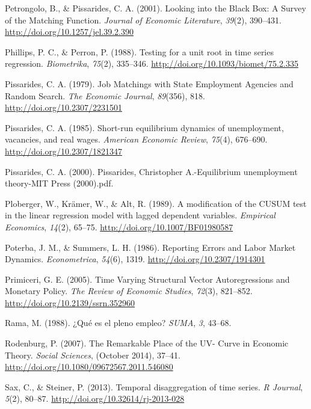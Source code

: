 \documentclass[12pt,oneside]{reedthesis}
\begin{document}
\leavevmode\hypertarget{ref-Petrongolo2001}{}%
Petrongolo, B., \& Pissarides, C. A. (2001). Looking into the Black Box: A Survey of the Matching Function. \emph{Journal of Economic Literature}, \emph{39}(2), 390--431. \url{http://doi.org/10.1257/jel.39.2.390}

\leavevmode\hypertarget{ref-PhillipsPerron1988}{}%
Phillips, P. C., \& Perron, P. (1988). Testing for a unit root in time series regression. \emph{Biometrika}, \emph{75}(2), 335--346. \url{http://doi.org/10.1093/biomet/75.2.335}

\leavevmode\hypertarget{ref-Pissarides1979}{}%
Pissarides, C. A. (1979). Job Matchings with State Employment Agencies and Random Search. \emph{The Economic Journal}, \emph{89}(356), 818. \url{http://doi.org/10.2307/2231501}

\leavevmode\hypertarget{ref-Pissarides1985}{}%
Pissarides, C. A. (1985). Short-run equilibrium dynamics of unemployment, vacancies, and real wages. \emph{American Economic Review}, \emph{75}(4), 676--690. \url{http://doi.org/10.2307/1821347}

\leavevmode\hypertarget{ref-Pissarides2000}{}%
Pissarides, C. A. (2000). Pissarides, Christopher A.-Equilibrium unemployment theory-MIT Press (2000).pdf.

\leavevmode\hypertarget{ref-Ploberger1989}{}%
Ploberger, W., Krämer, W., \& Alt, R. (1989). A modification of the CUSUM test in the linear regression model with lagged dependent variables. \emph{Empirical Economics}, \emph{14}(2), 65--75. \url{http://doi.org/10.1007/BF01980587}

\leavevmode\hypertarget{ref-Poterba1986}{}%
Poterba, J. M., \& Summers, L. H. (1986). Reporting Errors and Labor Market Dynamics. \emph{Econometrica}, \emph{54}(6), 1319. \url{http://doi.org/10.2307/1914301}

\leavevmode\hypertarget{ref-Primiceri2005}{}%
Primiceri, G. E. (2005). Time Varying Structural Vector Autoregressions and Monetary Policy. \emph{The Review of Economic Studies}, \emph{72}(3), 821--852. \url{http://doi.org/10.2139/ssrn.352960}

\leavevmode\hypertarget{ref-Rama1988}{}%
Rama, M. (1988). ¿Qué es el pleno empleo? \emph{SUMA}, \emph{3}, 43--68.

\leavevmode\hypertarget{ref-Rodenburg2007}{}%
Rodenburg, P. (2007). The Remarkable Place of the UV- Curve in Economic Theory. \emph{Social Sciences}, (October 2014), 37--41. \url{http://doi.org/10.1080/09672567.2011.546080}

\leavevmode\hypertarget{ref-Sax2013}{}%
Sax, C., \& Steiner, P. (2013). Temporal disaggregation of time series. \emph{R Journal}, \emph{5}(2), 80--87. \url{http://doi.org/10.32614/rj-2013-028}
\end{document}
